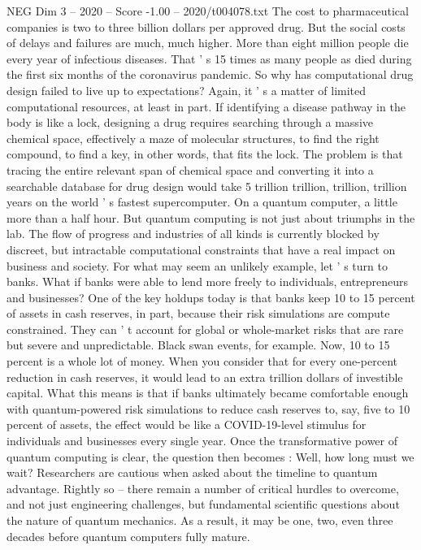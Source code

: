 \begin{textsample}{NEG Dim 3 – 2020 – Score -1.00 – 2020/t004078.txt}
The cost to pharmaceutical companies is two to three billion dollars per approved drug.
But the social costs of delays and failures are much, much higher.
More than eight million people die every year of infectious diseases.
That ' s 15 times as many people as died during the first six months of the coronavirus pandemic.
So why has computational drug design failed to live up to expectations?
Again, it ' s a matter of limited computational resources, at least in part.
If identifying a disease pathway in the body is like a lock, designing a drug requires searching through a massive chemical space, effectively a maze of molecular structures, to find the right compound, to find a key, in other words, that fits the lock.
The problem is that tracing the entire relevant span of chemical space and converting it into a searchable database for drug design would take 5 trillion trillion, trillion, trillion years on the world ' s fastest supercomputer.
On a quantum computer, a little more than a half hour.
But quantum computing is not just about triumphs in the lab.
The flow of progress and industries of all kinds is currently blocked by discreet, but intractable computational constraints that have a real impact on business and society.
For what may seem an unlikely example, let ' s turn to banks.
What if banks were able to lend more freely to individuals, entrepreneurs and businesses?
One of the key holdups today is that banks keep 10 to 15 percent of assets in cash reserves, in part, because their risk simulations are compute constrained.
They can ' t account for global or whole-market risks that are rare but severe and unpredictable.
Black swan events, for example.
Now, 10 to 15 percent is a whole lot of money.
When you consider that for every one-percent reduction in cash reserves, it would lead to an extra trillion dollars of investible capital.
What this means is that if banks ultimately became comfortable enough with quantum-powered risk simulations to reduce cash reserves to, say, five to 10 percent of assets, the effect would be like a COVID-19-level stimulus for individuals and businesses every single year.
Once the transformative power of quantum computing is clear, the question then becomes : Well, how long must we wait?
Researchers are cautious when asked about the timeline to quantum advantage.
Rightly so -- there remain a number of critical hurdles to overcome, and not just engineering challenges, but fundamental scientific questions about the nature of quantum mechanics.
As a result, it may be one, two, even three decades before quantum computers fully mature.

\end{textsample}

